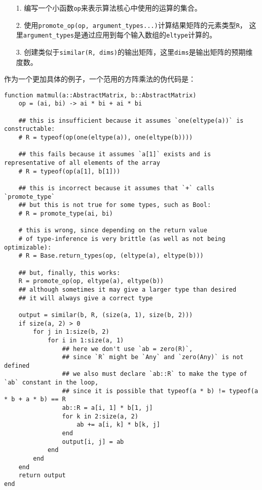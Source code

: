 \begin{itemize}
\item[1. ] 编写一个小函数\texttt{op}来表示算法核心中使用的运算的集合。


\item[2. ] 使用\texttt{promote\_op(op, argument\_types...)}计算结果矩阵的元素类型\texttt{R}， 这里\texttt{argument\_types}是通过应用到每个输入数组的\texttt{eltype}计算的。


\item[3. ] 创建类似于\texttt{similar(R, dims)}的输出矩阵，这里\texttt{dims}是输出矩阵的预期维度数。

\end{itemize}


作为一个更加具体的例子，一个范用的方阵乘法的伪代码是：




\begin{verbatim}
function matmul(a::AbstractMatrix, b::AbstractMatrix)
    op = (ai, bi) -> ai * bi + ai * bi

    ## this is insufficient because it assumes `one(eltype(a))` is constructable:
    # R = typeof(op(one(eltype(a)), one(eltype(b))))

    ## this fails because it assumes `a[1]` exists and is representative of all elements of the array
    # R = typeof(op(a[1], b[1]))

    ## this is incorrect because it assumes that `+` calls `promote_type`
    ## but this is not true for some types, such as Bool:
    # R = promote_type(ai, bi)

    # this is wrong, since depending on the return value
    # of type-inference is very brittle (as well as not being optimizable):
    # R = Base.return_types(op, (eltype(a), eltype(b)))

    ## but, finally, this works:
    R = promote_op(op, eltype(a), eltype(b))
    ## although sometimes it may give a larger type than desired
    ## it will always give a correct type

    output = similar(b, R, (size(a, 1), size(b, 2)))
    if size(a, 2) > 0
        for j in 1:size(b, 2)
            for i in 1:size(a, 1)
                ## here we don't use `ab = zero(R)`,
                ## since `R` might be `Any` and `zero(Any)` is not defined
                ## we also must declare `ab::R` to make the type of `ab` constant in the loop,
                ## since it is possible that typeof(a * b) != typeof(a * b + a * b) == R
                ab::R = a[i, 1] * b[1, j]
                for k in 2:size(a, 2)
                    ab += a[i, k] * b[k, j]
                end
                output[i, j] = ab
            end
        end
    end
    return output
end
\end{verbatim}




